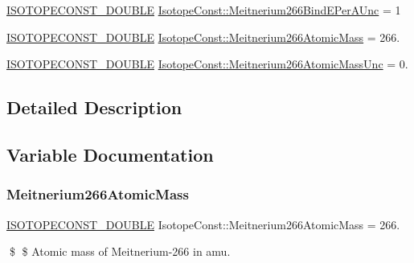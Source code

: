 \begin{DoxyCompactItemize}
\mbox{\hyperlink{group___isotope_const-_macros_ga8f45a7272ce02c0b4c65c44636ed719a}{I\+S\+O\+T\+O\+P\+E\+C\+O\+N\+S\+T\+\_\+\+D\+O\+U\+B\+LE}} \mbox{\hyperlink{group___isotope_const-_meitnerium-_mt266_ga1fdb513d763e17785da80fe9eb6476fb}{Isotope\+Const\+::\+Meitnerium266\+Bind\+E\+Per\+A\+Unc}} = 1
\item 
\mbox{\hyperlink{group___isotope_const-_macros_ga8f45a7272ce02c0b4c65c44636ed719a}{I\+S\+O\+T\+O\+P\+E\+C\+O\+N\+S\+T\+\_\+\+D\+O\+U\+B\+LE}} \mbox{\hyperlink{group___isotope_const-_meitnerium-_mt266_gac1f1093707c6789194fe9e886451bb61}{Isotope\+Const\+::\+Meitnerium266\+Atomic\+Mass}} = 266.
\item 
\mbox{\hyperlink{group___isotope_const-_macros_ga8f45a7272ce02c0b4c65c44636ed719a}{I\+S\+O\+T\+O\+P\+E\+C\+O\+N\+S\+T\+\_\+\+D\+O\+U\+B\+LE}} \mbox{\hyperlink{group___isotope_const-_meitnerium-_mt266_gabd61727623e5e3b5510c2416cd60fb76}{Isotope\+Const\+::\+Meitnerium266\+Atomic\+Mass\+Unc}} = 0.
\end{DoxyCompactItemize}


\subsection{Detailed Description}


\subsection{Variable Documentation}
\mbox{\label{group___isotope_const-_meitnerium-_mt266_gac1f1093707c6789194fe9e886451bb61}} 
\subsubsection{\texorpdfstring{Meitnerium266\+Atomic\+Mass}{Meitnerium266AtomicMass}}
{\footnotesize\ttfamily \mbox{\hyperlink{group___isotope_const-_macros_ga8f45a7272ce02c0b4c65c44636ed719a}{I\+S\+O\+T\+O\+P\+E\+C\+O\+N\+S\+T\+\_\+\+D\+O\+U\+B\+LE}} Isotope\+Const\+::\+Meitnerium266\+Atomic\+Mass = 266.}

\$ \$ Atomic mass of Meitnerium-\/266 in amu. \mbox{\label{group___isotope_const-_meitnerium-_mt266_gabd61727623e5e3b5510c2416cd60fb76}} 
